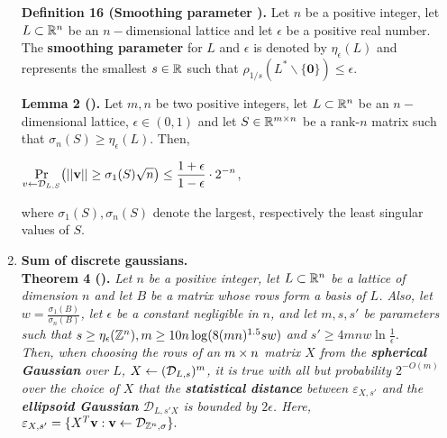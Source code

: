 \begin{enumerate}
	\textbf{Definition 16 (Smoothing parameter \cite{MiR04}).} Let $n$ be a positive integer,  let $L \subset \mathbb{R}^n$ be an $n-$dimensional lattice and let $\epsilon$ be a positive real number. The \textbf{smoothing parameter} for $L$ and $\epsilon$ is denoted by $\eta_\epsilon(L)$ and represents the smallest $s \in \mathbb{R}$ such that $\rho_{1/s}(L^* \backslash \{\textbf{0}\}) \leq \epsilon$.

	\textbf{Lemma 2 (\cite{AGH+12}).} Let $m,n$ be two positive integers,  let $L \subset \mathbb{R}^n$ be an $n-$dimensional lattice, $\epsilon \in (0,1)$ and let $S\in\mathbb{R}^{m\times n}$ be a rank-$n$ matrix such that $\sigma_n(S) \geq \eta_\epsilon(L)$. Then, 
	\begin{center}
		$\displaystyle{\Pr_{v \leftarrow\mathcal{D}_{L, S}}} \big( ||\textbf{v}|| \geq \sigma_1(S) \sqrt{n} \big)\leq \frac{1 + \epsilon}{1 - \epsilon} \cdot 2^{-n}$,
	\end{center}
where $\sigma_1(S), \sigma_n(S)$ denote the largest, respectively the least singular values of $S$.

\item \textbf{Sum of discrete gaussians.} \\
\textbf{Theorem 4 (\cite{GGH13}).} \textit{Let $n$ be a positive integer, let $L \subset \mathbb{R}^n$ be a lattice of dimension $n$ and let $B$ be a matrix whose rows form a basis of $L$. Also, let $w = \frac{\sigma_1(B)}{\sigma_n(B)}$, let $\epsilon$ be a constant negligible in $n$, and let $m, s, s'$ be parameters such that $s \geq \eta_\epsilon({\mathbb Z}^n), m \geq 10n\log(8(mn)^{1.5}sw)$ and $s' \geq 4mnw \ln \frac{1}{\epsilon}$.\\
Then, when choosing the rows of an $m\times n$ matrix $X$ from the \textbf{spherical Gaussian} over $L$, $X \leftarrow (\mathcal{D}_{L, s})^m$, it is true with all but probability $2^{-O(m)}$ over the choice of $X$ that the \textbf{statistical distance} between $\varepsilon_{X, s'}$ and the \textbf{ellipsoid Gaussian} $\mathcal{D}_{L, s'X}$ is bounded by $2\epsilon$. Here,} $\varepsilon_{X,s'} = \{X^T \textbf{v} : \textbf{v} \leftarrow \mathcal{D}_{{\mathbb Z}^n, \sigma}\}.$

\end{enumerate}

